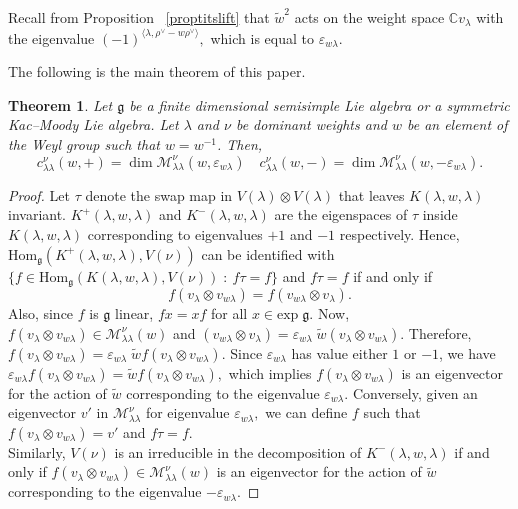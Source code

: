 \documentclass[12pt,reqno]{amsart}
\theoremstyle{plain}
\newtheorem{theorem}{Theorem}[section]
\theoremstyle{definition}
\theoremstyle{plain}
\newcommand{\lie}{\mathfrak}
\begin{document}
Recall from Proposition ~\ref{proptitslift} that $\widetilde{w}^2$ acts on the weight space $\mathbb{C}v_\lambda$ with the eigenvalue $(-1)^{\langle\lambda,\rho^\vee-w\rho^\vee\rangle},$ which is equal to $\varepsilon_{w\lambda}.$

The following is the main theorem of this paper.

\begin{theorem}\label{main}
     Let $\mathfrak{g}$ be a finite dimensional semisimple Lie algebra or a symmetric Kac--Moody Lie algebra. Let $\lambda$ and $\nu$ be dominant weights and $w$ be an element of the Weyl group such that $w=w^{-1}$. Then, $$c_{\lambda\lambda}^{\nu}(w,+)=\dim \mathcal{M}_{\lambda\lambda}^{\nu}(w,\varepsilon_{w\lambda}) \quad c_{\lambda\lambda}^{\nu}(w,-)=\dim \mathcal{M}_{\lambda\lambda}^{\nu}(w,-\varepsilon_{w\lambda}).$$
\end{theorem}
\begin{proof}
   Let $\tau$ denote the swap map in $V(\lambda)\otimes V(\lambda)$ that leaves $K(\lambda,w,\lambda)$ invariant. $K^+(\lambda, w,\lambda)$ and $K^-(\lambda, w,\lambda)$ are the eigenspaces of $\tau$ inside $K(\lambda, w,\lambda)$ corresponding to eigenvalues $+1$ and $-1$ respectively. Hence, $ \text{Hom}_{\lie g}(K^+(\lambda,w,\lambda),V(\nu))$ can be identified with $\{f\in \text{Hom}_{\lie g}(K(\lambda,w,\lambda),V(\nu))\;:\: f\tau=f\}$ and
   $f\tau=f$ if and only if  $$f(v_\lambda\otimes v_{w\lambda})=f(v_{w\lambda}\otimes v_\lambda).$$ Also, since $f$ is $\lie g$ linear, $fx=xf$ for all $x\in \text{exp}\;\lie g.$ Now, $f(v_\lambda\otimes v_{w\lambda})\in \mathcal{M}_{\lambda\lambda}^{\nu}(w)$ and $ (v_{w\lambda}\otimes v_\lambda)= \varepsilon_{w\lambda}\;\widetilde{w} (v_\lambda\otimes v_{w\lambda}). $ Therefore, $f(v_\lambda\otimes v_{w\lambda})=\varepsilon_{w\lambda}\;\widetilde{w}f(v_\lambda\otimes v_{w\lambda}).$ Since $\varepsilon_{w\lambda} $ has value either $1$ or $-1$, we have $\varepsilon_{w\lambda} f(v_\lambda\otimes v_{w\lambda})=\widetilde{w}f(v_\lambda\otimes v_{w\lambda}),$ which implies $f(v_\lambda\otimes v_{w\lambda})$ is an eigenvector for the action of $\widetilde{w}$ corresponding to the eigenvalue $\varepsilon_{w\lambda}.$ Conversely, given an eigenvector $v'$ in $\mathcal{M}_{\lambda\lambda}^{\nu}$ for eigenvalue $\varepsilon_{w\lambda},$ we can define $f$ such that $f(v_\lambda\otimes v_{w\lambda})= v'$ and $f\tau=f.$ \\
   Similarly, $V(\nu)$ is an irreducible in the decomposition of $K^-(\lambda, w,\lambda)$ if and only if $f(v_\lambda\otimes v_{w\lambda})\in \mathcal{M}_{\lambda\lambda}^\nu(w)$ is an eigenvector for the action of $\widetilde{w}$ corresponding to the eigenvalue $-\varepsilon_{w\lambda}.$
\end{proof}
\end{document}
